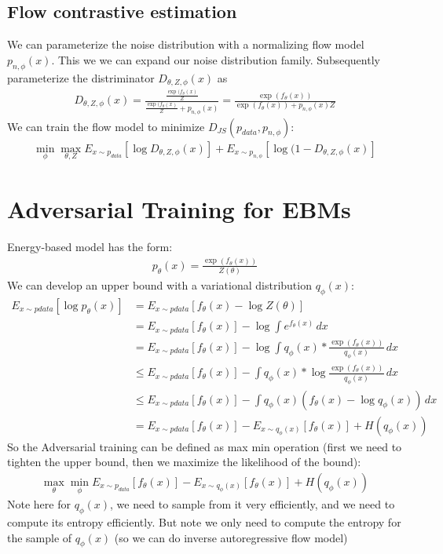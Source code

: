 \subsection{Flow contrastive estimation}
We can parameterize the noise distribution with a normalizing flow model $p_{n,\phi}(x)$. This we we can expand our noise distribution family. Subsequently parameterize the distriminator $D_{\theta,Z,\phi}(x) $ as 
    \begin{align*}
        D_{\theta, Z, \phi}(x) = \frac{\frac{\exp(f_\theta(x)}{Z}}{\frac{\exp(f_\theta(x)}{Z} + p_{n, \phi}(x)} = \frac{\exp(f_\theta(x))}{\exp(f_\theta(x)) + p_{n,\phi}(x)Z}
    \end{align*}
We can train the flow model to minimize $D_{JS}(p_{data}, p_{n,\phi})$: 
    \begin{align*}
        \min_\phi \max_{\theta,Z} E_{x\sim p_{data}}[\log D_{\theta,Z,\phi}(x)] + E_{x\sim p_{n, \phi}}[\log (1-D_{\theta,Z,\phi}(x)]
    \end{align*}
    
    
\section{Adversarial Training for EBMs} 
Energy-based model has the form: 
    \begin{align*}
        p_\theta(x) = \frac{\exp(f_\theta(x))}{Z(\theta)}
    \end{align*}
We can develop an upper bound with a variational distribution $q_\phi(x)$: 
    \begin{align*}
        E_{x\sim p{data}}[\log p_\theta(x)]
        & = E_{x\sim p{data}}[f_\theta(x) - \log Z(\theta)]\\
        & =  E_{x\sim p{data}}[f_\theta(x)] - \log \int e^{f_\theta(x)} \, dx\\
        & = E_{x\sim p{data}}[f_\theta(x)] - \log \int q_\phi(x) * \frac{\exp(f_\theta(x))}{q_\phi(x)}\, dx\\
        & \leq  E_{x\sim p{data}}[f_\theta(x)] - \int q_\phi(x) *\log  \frac{\exp(f_\theta(x))}{q_\phi(x)}\, dx\\
        & \leq  E_{x\sim p{data}}[f_\theta(x)] - \int q_\phi(x) (f_\theta(x) - \log q_\phi(x))\, dx\\
        & = E_{x\sim p{data}}[f_\theta(x)] - E_{x\sim q_\phi(x)}[f_\theta(x)] + H(q_\phi(x))
    \end{align*}
So the Adversarial training can be defined as  max min operation (first we need to tighten the upper bound, then we maximize the likelihood of the bound):
    \begin{align*}
        \max_\theta \min_\phi E_{x\sim p_{data}}[f_\theta(x)] - E_{x\sim q_\phi(x)}[f_\theta(x)] + H(q_\phi(x))
    \end{align*}
Note here for $q_\phi(x)$, we need to sample from it very efficiently, and we need to compute its entropy efficiently. But note we only need to compute the entropy for the sample of $q_\phi(x)$ (so we can do inverse autoregressive flow model)
